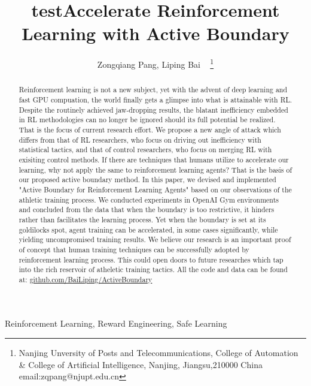 \documentclass[journal]{IEEEtran}
\begin{document}
    \title{test}
\title{Accelerate Reinforcement Learning with Active Boundary}

\author{ Zongqiang Pang, Liping Bai ~ \thanks{Nanjing Unversity of Posts and Telecommunications, College of Automation \& College of Artificial Intelligence, Nanjing, Jiangsu,210000 China email:zqpang@njupt.edu.cn}}
\maketitle
\begin{abstract}
Reinforcement learning is not a new subject, yet with the advent of deep learning and fast GPU compuation, the world finally gets a glimpse into what is attainable with RL. Despite the routinely achieved jaw-dropping results, the blatant inefficiency embedded in RL methodologies can no longer be ignored should its full potential be realized. That is the focus of current research effort. We propose a new angle of attack which differs from that of RL researchers, who focus on driving out inefficiency with statistical tactics, and that of control researchers, who focus on merging RL with exisiting control methods. If there are techniques that humans utilize to accelerate our learning, why not apply the same to reinforcement learning agents? That is the basis of our proposed active boundary method. In this paper, we devised and implemented "Active Boundary for Reinforcement Learning Agents" based on our observations of the athletic training process. We conducted experiments in OpenAI Gym environments and concluded from the data that when the boundary is too restrictive, it hinders rather than facilitates the learning process. Yet when the boundary is set at its goldilocks spot, agent training can be accelerated, in some cases significantly, while yielding uncompromised training results. We believe our research is an important proof of concept that human training techniques can be successfully adopted by reinforcement learning process. This could open doors to future researches which tap into the rich reservoir of atheletic training tactics. All the code and data can be found at: \href{https://github.com/BaiLiping/ActiveBoundary}{github.com/BaiLiping/ActiveBoundary}
\end{abstract}
\begin{IEEEkeywords}
Reinforcement Learning, Reward Engineering, Safe Learning
\end{IEEEkeywords}
\IEEEpeerreviewmaketitle
\end{document}
